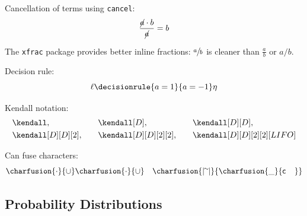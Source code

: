 Cancellation of terms using \texttt{cancel}:
\begin{equation*}
    \frac{\cancel{a} \cdot b}{\cancel{a}} = b
\end{equation*}

The \texttt{xfrac} package provides better inline fractions: $\sfrac{a}{b}$ is cleaner than $\frac{a}{b}$ or $a/b$.

Decision rule:
\begin{equation*}
    \ell \decisionrule{a = 1}{a = -1} \eta
\end{equation*}

Kendall notation:
\begin{align*}
    &\kendall,
    \quad &&\kendall[D],
    \quad &&\kendall[D][D], \\
    &\kendall[D][D][2],
    \quad &&\kendall[D][D][2][2],
    \quad &&\kendall[D][D][2][2][LIFO]
\end{align*}

Can fuse characters:
\begin{equation*}
    \charfusion{\cdot}{\cup}\charfusion{\cdot}{\cup} \quad \charfusion{|\!\mkern 1.4mu{}^{\sim}\!\mkern 1.4mu|}{\charfusion{\mathbf{\_}}{\mathsf{c}\enspace\enspace\mkern 1.4mu}}
\end{equation*}

\subsection{Probability Distributions}

